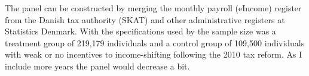 The panel can be constructed by merging the monthly payroll (eIncome) register from the Danish tax authority (SKAT) and other administrative registers at Statistics Denmark. With the specifications used by \citet{kreiner2016tax} the sample size was a treatment group of 219,179 individuals and a control group of 109,500 individuals with weak or no incentives to income-shifting following the 2010 tax reform. As I include more years the panel would decrease a bit.

